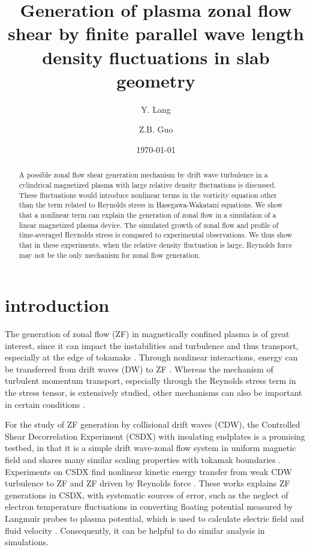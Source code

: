 \documentclass[aps,pre,twocolumn,superscriptaddress]{revtex4-1}
\begin{document}
\title{
Generation of plasma zonal flow shear by finite parallel wave length density fluctuations in slab geometry
}


\author{Y. Lang}
\author{Z.B. Guo}

\date{\today}


\begin{abstract}
A possible zonal flow shear generation mechanism by drift wave turbulence in a cylindrical magnetized plasma with large relative density fluctuations is discussed. These fluctuations would introduce nonlinear terms in the vorticity equation other than the term related to Reynolds stress in Hasegawa-Wakatani equations. We show that a nonlinear term can explain the generation of zonal flow in a simulation of a linear magnetized plasma device. The simulated growth of zonal flow and profile of time-averaged Reynolds stress is compared to experimental observations. We thus show that in these experiments, when the relative density fluctuation is large, Reynolds force may not be the only mechanism for zonal flow generation.
\end{abstract}
\maketitle


\section{\label{sec:introduction}introduction}
The generation of zonal flow (ZF) in magnetically confined plasma is of great interest, since it can impact the instabilities and turbulence and thus transport, especially at the edge of tokamaks \cite{Li_2020}. Through nonlinear interactions, energy can be transferred from drift waves (DW) to ZF \cite{Diamond_2005}. Whereas the mechanism of turbulent momentum transport, especially through the Reynolds stress term in the stress tensor, is extensively studied, other mechanisms can also be important in certain conditions \cite{Diamond_2009, Diamond_2013}.

For the study of ZF generation by collisional drift waves (CDW), the Controlled Shear Decorrelation Experiment (CSDX) with insulating endplates \cite{Thakur_2013} is a promising testbed, in that it is a simple drift wave-zonal flow system \cite{Xu_2010, Hajjar_2018} in uniform magnetic field and shares many similar scaling properties with tokamak boundaries \cite{Cui_2016}. Experiments on CSDX find nonlinear kinetic energy transfer from weak CDW turbulence to ZF \cite{Xu_2009, Xu_2010} and ZF driven by Reynolds force \cite{Holland_2006,Yan_2008,Yan_2010}. These works explains ZF generations in CSDX, with systematic sources of error, such as the neglect of electron temperature fluctuations in converting floating potential measured by Langmuir probes to plasma potential, which is used to calculate electric field and fluid velocity \cite{Holland_2006,Xu_2009}. Consequently, it can be helpful to do similar analysis in simulations.
\end{document}
